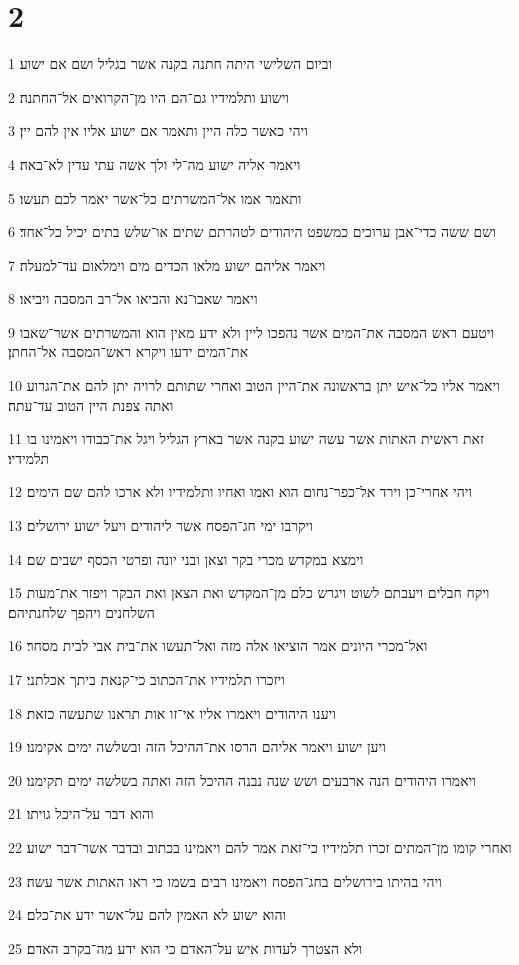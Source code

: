 \chapter{2}

\par 1 וביום השלישי היתה חתנה בקנה אשר בגליל ושם אם ישוע׃
\par 2 וישוע ותלמידיו גם־הם היו מן־הקרואים אל־החתנה׃
\par 3 ויהי כאשר כלה היין ותאמר אם ישוע אליו אין להם יין׃
\par 4 ויאמר אליה ישוע מה־לי ולך אשה עתי עדין לא־באה׃
\par 5 ותאמר אמו אל־המשרתים כל־אשר יאמר לכם תעשו׃
\par 6 ושם ששה כדי־אבן ערוכים כמשפט היהודים לטהרתם שתים או־שלש בתים יכיל כל־אחד׃
\par 7 ויאמר אליהם ישוע מלאו הכדים מים וימלאום עד־למעלה׃
\par 8 ויאמר שאבו־נא והביאו אל־רב המסבה ויביאו׃
\par 9 ויטעם ראש המסבה את־המים אשר נהפכו ליין ולא ידע מאין הוא והמשרתים אשר־שאבו את־המים ידעו ויקרא ראש־המסבה אל־החתן׃
\par 10 ויאמר אליו כל־איש יתן בראשונה את־היין הטוב ואחרי שתותם לרויה יתן להם את־הגרוע ואתה צפנת היין הטוב עד־עתה׃
\par 11 זאת ראשית האתות אשר עשה ישוע בקנה אשר בארץ הגליל ויגל את־כבודו ויאמינו בו תלמידיו׃
\par 12 ויהי אחרי־כן וירד אל־כפר־נחום הוא ואמו ואחיו ותלמידיו ולא ארכו להם שם הימים׃
\par 13 ויקרבו ימי חג־הפסח אשר ליהודים ויעל ישוע ירושלים׃
\par 14 וימצא במקדש מכרי בקר וצאן ובני יונה ופרטי הכסף ישבים שם׃
\par 15 ויקח חבלים ויעבתם לשוט ויגרש כלם מן־המקדש ואת הצאן ואת הבקר ויפזר את־מעות השלחנים ויהפך שלחנתיהם׃
\par 16 ואל־מכרי היונים אמר הוציאו אלה מזה ואל־תעשו את־בית אבי לבית מסחר׃
\par 17 ויזכרו תלמידיו את־הכתוב כי־קנאת ביתך אכלתני׃
\par 18 ויענו היהודים ויאמרו אליו אי־זו אות תראנו שתעשה כזאת׃
\par 19 ויען ישוע ויאמר אליהם הרסו את־ההיכל הזה ובשלשה ימים אקימנו׃
\par 20 ויאמרו היהודים הנה ארבעים ושש שנה נבנה ההיכל הזה ואתה בשלשה ימים תקימנו׃
\par 21 והוא דבר על־היכל גויתו׃
\par 22 ואחרי קומו מן־המתים זכרו תלמידיו כי־זאת אמר להם ויאמינו בכתוב ובדבר אשר־דבר ישוע׃
\par 23 ויהי בהיתו בירושלים בחג־הפסח ויאמינו רבים בשמו כי ראו האתות אשר עשה׃
\par 24 והוא ישוע לא האמין להם על־אשר ידע את־כלם׃
\par 25 ולא הצטרך לעדות איש על־האדם כי הוא ידע מה־בקרב האדם׃

